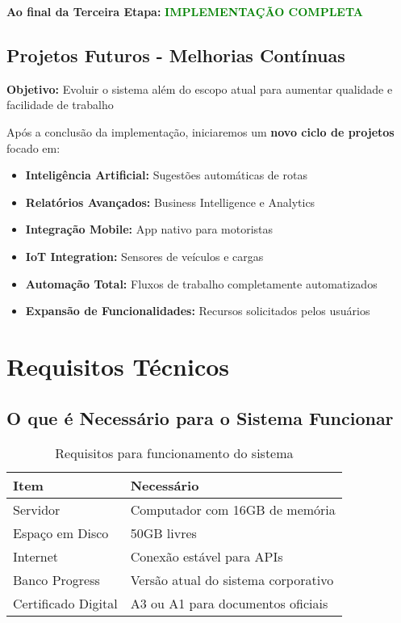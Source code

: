 \documentclass[12pt,a4paper]{article}
\begin{document}
\textbf{Ao final da Terceira Etapa:} \textcolor{green}{\textbf{IMPLEMENTAÇÃO COMPLETA}}

\subsection{Projetos Futuros - Melhorias Contínuas}
\textbf{Objetivo:} Evoluir o sistema além do escopo atual para aumentar qualidade e facilidade de trabalho

Após a conclusão da implementação, iniciaremos um \textbf{novo ciclo de projetos} focado em:
\begin{itemize}
    \item \textbf{Inteligência Artificial:} Sugestões automáticas de rotas
    \item \textbf{Relatórios Avançados:} Business Intelligence e Analytics
    \item \textbf{Integração Mobile:} App nativo para motoristas
    \item \textbf{IoT Integration:} Sensores de veículos e cargas
    \item \textbf{Automação Total:} Fluxos de trabalho completamente automatizados
    \item \textbf{Expansão de Funcionalidades:} Recursos solicitados pelos usuários
\end{itemize}

\section{Requisitos Técnicos}

\subsection{O que é Necessário para o Sistema Funcionar}
\begin{table}[H]
    \centering
    \begin{tabularx}{\textwidth}{|l|X|}
        \hline
        \textbf{Item} & \textbf{Necessário} \\
        \hline
        Servidor & Computador com 16GB de memória \\
        Espaço em Disco & 50GB livres \\
        Internet & Conexão estável para APIs \\
        Banco Progress & Versão atual do sistema corporativo \\
        Certificado Digital & A3 ou A1 para documentos oficiais \\
        \hline
    \end{tabularx}
    \caption{Requisitos para funcionamento do sistema}
\end{table}
\end{document}
